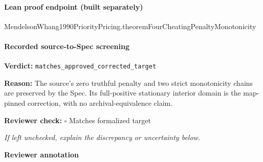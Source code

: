 \documentclass[10pt]{article}
\newcommand{\reviewerbox}{%
  \par\noindent\fbox{\parbox{0.96\linewidth}{\rule{0pt}{0.38in}}}\par
}
\newcommand{\reviewmatch}[1]{%
  \par\noindent\textbf{Reviewer check:} $\square$\; #1\par
  \noindent\emph{If left unchecked, explain the discrepancy or uncertainty below.}\par
}
\begin{document}
\paragraph{Lean proof endpoint (built separately)}\begin{ReviewVerbatim}
MendelsonWhang1990PriorityPricing.theoremFourCheatingPenaltyMonotonicity
\end{ReviewVerbatim}

\paragraph{Recorded source-to-Spec screening}
\textbf{Verdict:} \texttt{matches\_approved\_corrected\_target}
\\
{\raggedright
\textbf{Reason:} The source's zero truthful penalty and two strict monotonicity chains are preserved by the Spec.\allowbreak{} Its full-\allowbreak{}positive stationary interior domain is the map-\allowbreak{}pinned correction, with no archival-\allowbreak{}equivalence claim.\allowbreak{}
\par}
\reviewmatch{Matches formalized target}
\noindent\textbf{Reviewer annotation}\par
\reviewerbox
\end{document}
